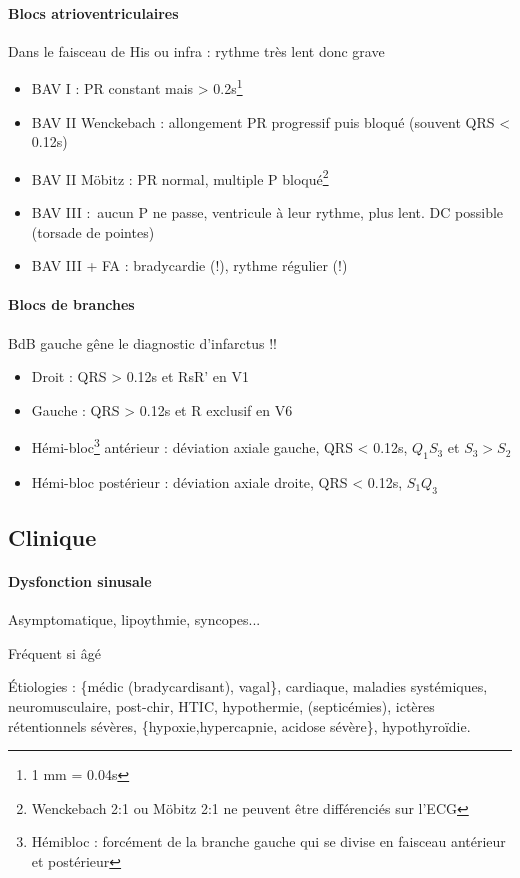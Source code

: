 \documentclass{article}
\begin{document}
\paragraph{Blocs atrioventriculaires}
Dans le faisceau de His ou infra : rythme très lent donc grave \skull
\begin{itemize}
  \item BAV I : PR constant mais > 0.2s\footnote{1 mm = 0.04s}
  \item BAV II Wenckebach : allongement PR progressif puis bloqué (souvent QRS
    < 0.12s)
  \item BAV II Möbitz : PR normal, multiple P bloqué\footnote{Wenckebach 2:1 ou
    Möbitz 2:1 ne peuvent être différenciés sur l'ECG}
  \item BAV III : aucun P ne passe, ventricule à leur rythme, plus lent.
    \danger{} DC possible (torsade de pointes)
  \item BAV III + FA : bradycardie (!), rythme
    régulier (!)
\end{itemize}

\paragraph{Blocs de branches}
\danger{} BdB gauche gêne le diagnostic d'infarctus !!
\begin{itemize}
  \item Droit : QRS > 0.12s et RsR' en V1 
  \item Gauche : QRS > 0.12s et R exclusif en V6 
  \item Hémi-bloc\footnote{Hémibloc : forcément de la branche gauche qui se
    divise en faisceau antérieur et postérieur} antérieur : déviation axiale
  gauche, QRS < 0.12s, $Q_1S_3$ et $S_3 > S_2$
  \item Hémi-bloc postérieur : déviation axiale droite, QRS < 0.12s, $S_1Q_3$

\end{itemize}

\subsection{Clinique}
\paragraph{Dysfonction sinusale}
Asymptomatique, lipoythmie, syncopes...

Fréquent si âgé

Étiologies : \{médic (bradycardisant), vagal\}, cardiaque, maladies systémiques, neuromusculaire,
post-chir, HTIC, hypothermie, (septicémies), ictères rétentionnels sévères,
\{hypoxie,hypercapnie, acidose sévère\}, hypothyroïdie.
\end{document}
